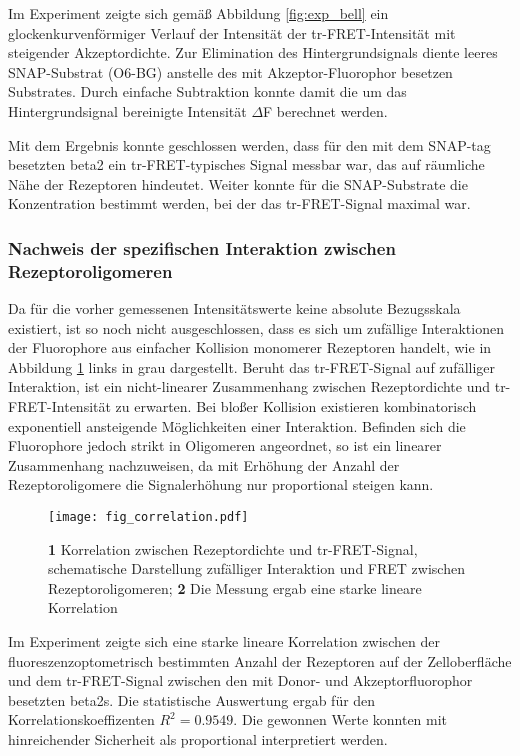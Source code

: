 Im Experiment zeigte sich gemäß Abbildung \ref{fig:exp_bell} ein glockenkurvenförmiger Verlauf der Intensität der tr-FRET-Intensität mit steigender Akzeptordichte. Zur Elimination des Hintergrundsignals diente leeres SNAP-Substrat (O6-BG) anstelle des mit Akzeptor-Fluorophor besetzen Substrates. Durch einfache Subtraktion konnte damit die um das Hintergrundsignal bereinigte Intensität $\Delta$F berechnet werden. 

Mit dem Ergebnis konnte geschlossen werden, dass für den mit dem SNAP-tag besetzten \gls{beta2} ein tr-FRET-typisches Signal messbar war, das auf räumliche Nähe der Rezeptoren hindeutet. Weiter konnte für die SNAP-Substrate die Konzentration bestimmt werden, bei der das tr-FRET-Signal maximal war. 

\subsubsection{Nachweis der spezifischen Interaktion zwischen Rezeptoroligomeren}

Da für die vorher gemessenen Intensitätswerte keine absolute Bezugsskala existiert, ist so noch nicht ausgeschlossen, dass es sich um zufällige Interaktionen der Fluorophore aus einfacher Kollision monomerer Rezeptoren handelt, wie in Abbildung \ref{fig:correlation} links in grau dargestellt. Beruht das tr-FRET-Signal auf zufälliger Interaktion, ist ein nicht-linearer Zusammenhang zwischen Rezeptordichte und tr-FRET-Intensität zu erwarten. Bei bloßer Kollision existieren kombinatorisch exponentiell ansteigende Möglichkeiten einer Interaktion.  Befinden sich die Fluorophore jedoch strikt in Oligomeren angeordnet, so ist ein linearer Zusammenhang nachzuweisen, da mit Erhöhung der Anzahl der Rezeptoroligomere die Signalerhöhung nur proportional steigen kann.

\begin{figure}[htbp]
	\centering
    \texttt{[image: fig\_correlation.pdf]}
    \caption{\textbf{1} Korrelation zwischen Rezeptordichte und tr-FRET-Signal, schematische Darstellung zufälliger Interaktion und FRET zwischen Rezeptoroligomeren; \textbf{2} Die Messung ergab eine starke lineare Korrelation} 
    \label{fig:correlation}
\end{figure}

Im Experiment zeigte sich eine starke lineare Korrelation zwischen der fluoreszenzoptometrisch bestimmten Anzahl der Rezeptoren auf der Zelloberfläche und dem tr-FRET-Signal zwischen den mit Donor- und Akzeptorfluorophor besetzten \gls{beta2}s. Die statistische Auswertung ergab für den Korrelationskoeffizenten $R^2=0.9549$. Die gewonnen Werte konnten mit hinreichender Sicherheit als proportional interpretiert werden.

